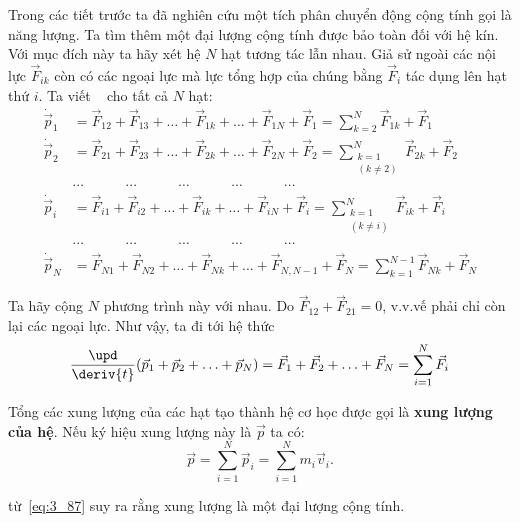 Trong các tiết trước ta đã nghiên cứu một tích phân chuyển động cộng tính gọi là năng lượng. Ta tìm thêm một đại lượng cộng tính được bảo toàn đối với hệ kín. Với mục đích này ta hãy xét hệ $N$ hạt tương tác lẫn nhau. Giả sử ngoài các nội lực $\vec{F}_{ik}$ còn có các ngoại lực mà lực tổng hợp của chúng bằng $\vec{F}_i$ tác dụng lên hạt thứ $i$. Ta viết ~  cho tất cả $N$ hạt:
\begin{align*}
\dot{\vec{p}}_1 &= \vec{F}_{12} + \vec{F}_{13} + \ldots + \vec{F}_{1k} + \ldots + \vec{F}_{1N} + \vec{F}_{1} = \sum_{k=2}^{N} \vec{F}_{1k} + \vec{F}_{1}\\
\dot{\vec{p}}_2 &= \vec{F}_{21} + \vec{F}_{23} + \ldots + \vec{F}_{2k} + \ldots + \vec{F}_{2N} + \vec{F}_{2} = \sum_{\substack{k=1\\(k\neq 2)}}^{N} \vec{F}_{2k} + \vec{F}_{2}\\
&\cdots \quad\quad\quad\cdots \quad\quad\quad\cdots \quad\quad\quad\cdots \quad\quad\quad\cdots\\
\dot{\vec{p}}_i &= \vec{F}_{i1} + \vec{F}_{i2} + \ldots + \vec{F}_{ik} + \ldots + \vec{F}_{iN} + \vec{F}_{i} = \sum_{\substack{k=1\\(k\neq i)}}^{N} \vec{F}_{ik} + \vec{F}_{i}\\
&\cdots \quad\quad\quad\cdots \quad\quad\quad\cdots \quad\quad\quad\cdots \quad\quad\quad\cdots\\
\dot{\vec{p}}_N &= \vec{F}_{N1} + \vec{F}_{N2} + \ldots + \vec{F}_{Nk} + \ldots + \vec{F}_{N,N-1} + \vec{F}_{N} = \sum_{k=1}^{N-1} \vec{F}_{Nk} + \vec{F}_{N}
\end{align*}

Ta hãy cộng $N$ phương trình này với nhau. Do $\vec{F}_{12}+\vec{F}_{21}=0$, v.v.vế phải chỉ còn lại các ngoại lực. Như vậy, ta đi tới hệ thức
\begin{equation}\label{eq:3_86}
\frac{\upd}{\deriv{t}}(\vec{p}_1+\vec{p}_2+\ldots+\vec{p}_N) = \vec{F}_1+\vec{F}_2+\ldots+\vec{F}_N = \sum_{i=1}^{N} \vec{F}_i
\end{equation}

Tổng các xung lượng của các hạt tạo thành hệ cơ học được gọi là \textbf{xung lượng của hệ}. Nếu ký hiệu xung lượng này là $\vec{p}$ ta có:
\begin{equation}\label{eq:3_87}
\vec{p} = \sum_{i=1}^{N} \vec{p}_i = \sum_{i=1}^{N} m_i\vec{v}_i.
\end{equation}

\noindent
từ~\eqref{eq:3_87} suy ra rằng xung lượng là một đại lượng cộng tính. 

